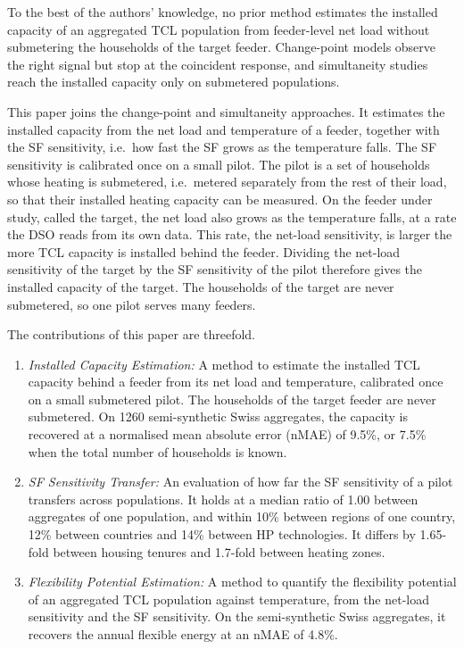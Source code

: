 To the best of the authors' knowledge, no prior method estimates the installed capacity of an aggregated TCL population from feeder-level net load without submetering the households of the target feeder. Change-point models observe the right signal but stop at the coincident response, and simultaneity studies reach the installed capacity only on submetered populations.

This paper joins the change-point and simultaneity approaches. It estimates the installed capacity from the net load and temperature of a feeder, together with the SF sensitivity, i.e.\ how fast the SF grows as the temperature falls. The SF sensitivity is calibrated once on a small pilot. The pilot is a set of households whose heating is submetered, i.e.\ metered separately from the rest of their load, so that their installed heating capacity can be measured. On the feeder under study, called the target, the net load also grows as the temperature falls, at a rate the DSO reads from its own data. This rate, the net-load sensitivity, is larger the more TCL capacity is installed behind the feeder. Dividing the net-load sensitivity of the target by the SF sensitivity of the pilot therefore gives the installed capacity of the target. The households of the target are never submetered, so one pilot serves many feeders.

The contributions of this paper are threefold.
\begin{enumerate}
\item \emph{Installed Capacity Estimation:} A method to estimate the installed TCL capacity behind a feeder from its net load and temperature, calibrated once on a small submetered pilot. The households of the target feeder are never submetered. On 1260 semi-synthetic Swiss aggregates, the capacity is recovered at a normalised mean absolute error (nMAE) of 9.5\%, or 7.5\% when the total number of households is known.
\item \emph{SF Sensitivity Transfer:} An evaluation of how far the SF sensitivity of a pilot transfers across populations. It holds at a median ratio of 1.00 between aggregates of one population, and within 10\% between regions of one country, 12\% between countries and 14\% between HP technologies. It differs by 1.65-fold between housing tenures and 1.7-fold between heating zones.
\item \emph{Flexibility Potential Estimation:} A method to quantify the flexibility potential of an aggregated TCL population against temperature, from the net-load sensitivity and the SF sensitivity. On the semi-synthetic Swiss aggregates, it recovers the annual flexible energy at an nMAE of 4.8\%.
\end{enumerate}

